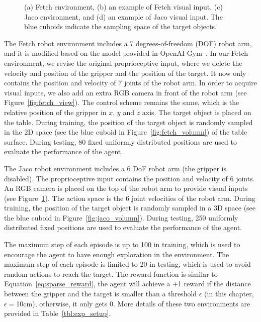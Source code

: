 \begin{figure}[h!]
\begin{subfigure}{0.24\columnwidth}
    \label{fig:jaco_view}
  \end{subfigure}
  \caption[Examples of Fetch and Jaco robot manipulation environments.]{(a) Fetch environment, (b) an example of Fetch visual input, (c) Jaco environment, and (d) an example of Jaco visual input. The blue cuboids indicate the sampling space of the target objects.}
  \label{fig:robot_setups}
\end{figure}

The Fetch robot environment includes a 7 degrees-of-freedom (DOF) robot arm, and it is modified based on the model provided in OpenAI Gym~\cite{plappert2018multi}. In our Fetch environment, we revise the original proprioceptive input, where we delete the velocity and position of the gripper and the position of the target. It now only contains the position and velocity of 7 joints of the robot arm. In order to acquire visual inputs, we also add an extra RGB camera in front of the robot arm (see Figure~\ref{fig:fetch_view}). The control scheme remains the same, which is the relative position of the gripper in $x$, $y$ and $z$ axis. The target object is placed on the table. During training, the position of the target object is randomly sampled in the 2D space (see the blue cuboid in Figure~\ref{fig:fetch_volumn}) of the table surface. During testing, 80 fixed uniformly distributed positions are used to evaluate the performance of the agent.

The Jaco robot environment includes a 6 DoF robot arm (the gripper is disabled). The proprioceptive input contains the position and velocity of 6 joints. An RGB camera is placed on the top of the robot arm to provide visual inputs (see Figure~\ref{fig:jaco_view}). The action space is the 6 joint velocities of the robot arm. During training, the position of the target object is randomly sampled in a 3D space (see the blue cuboid in Figure~\ref{fig:jaco_volumn}). During testing, 250 uniformly distributed fixed positions are used to evaluate the performance of the agent.

The maximum step of each episode is up to 100 in training, which is used to encourage the agent to have enough exploration in the environment. The maximum step of each episode is limited to 20 in testing, which is used to avoid random actions to reach the target. The reward function is similar to Equation~\eqref{eq:sparse_reward}, the agent will achieve a +1 reward if the distance between the gripper and the target is smaller than a threshold $\epsilon$ (in this chapter, $\epsilon=$10cm), otherwise, it only gets 0. More details of these two environments are provided in Table~\ref{tbl:exp_setup}.

